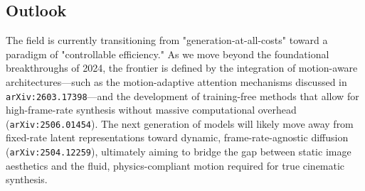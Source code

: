 \documentclass[11pt]{article}
\begin{document}
\subsection{Outlook}

The field is currently transitioning from "generation-at-all-costs" toward a paradigm of "controllable efficiency." As we move beyond the foundational breakthroughs of 2024, the frontier is defined by the integration of motion-aware architectures—such as the motion-adaptive attention mechanisms discussed in \texttt{arXiv:2603.17398}—and the development of training-free methods that allow for high-frame-rate synthesis without massive computational overhead (\texttt{arXiv:2506.01454}). The next generation of models will likely move away from fixed-rate latent representations toward dynamic, frame-rate-agnostic diffusion (\texttt{arXiv:2504.12259}), ultimately aiming to bridge the gap between static image aesthetics and the fluid, physics-compliant motion required for true cinematic synthesis.
\end{document}
